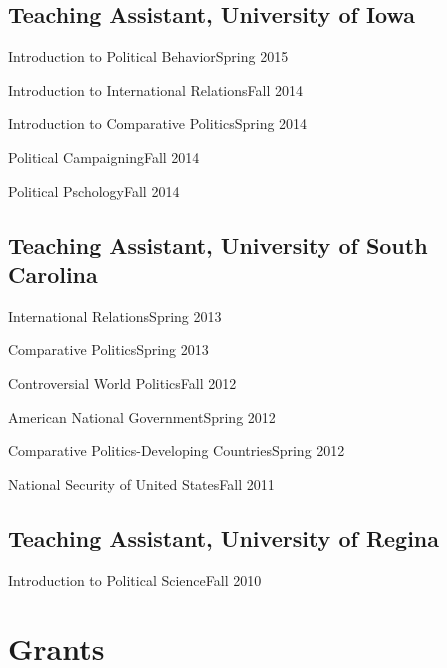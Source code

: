\documentclass[10.5pt,]{article}
\providecommand{\tightlist}{%
  \setlength{\itemsep}{0pt}\setlength{\parskip}{0pt}}
\renewenvironment{itemize}{
  \begin{list}{}{
    \setlength{\leftmargin}{1.5em}
  }
}{
  \end{list}
}
\begin{document}
\subsection{Teaching Assistant, University of
Iowa}\label{teaching-assistant-university-of-iowa}

\begin{itemize}
\tightlist
\item
  Introduction to Political Behavior\hfill Spring 2015
\item
  Introduction to International Relations\hfill Fall 2014
\item
  Introduction to Comparative Politics\hfill Spring 2014
\item
  Political Campaigning\hfill Fall 2014
\item
  Political Pschology\hfill Fall 2014
\end{itemize}

\subsection{Teaching Assistant, University of South
Carolina}\label{teaching-assistant-university-of-south-carolina}

\begin{itemize}
\tightlist
\item
  International Relations\hfill Spring 2013
\item
  Comparative Politics\hfill Spring 2013
\item
  Controversial World Politics\hfill Fall 2012
\item
  American National Government\hfill Spring 2012
\item
  Comparative Politics-Developing Countries\hfill Spring 2012
\item
  National Security of United States\hfill Fall 2011
\end{itemize}

\subsection{Teaching Assistant, University of
Regina}\label{teaching-assistant-university-of-regina}

\begin{itemize}
\tightlist
\item
  Introduction to Political Science\hfill Fall 2010
\end{itemize}

\section{Grants}\label{grants}
\end{document}
